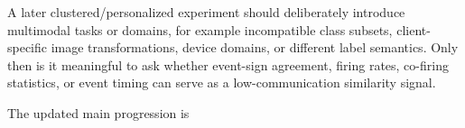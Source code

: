 A later clustered/personalized experiment should deliberately introduce multimodal tasks or domains, for example incompatible class subsets, client-specific image transformations, device domains, or different label semantics. Only then is it meaningful to ask whether event-sign agreement, firing rates, co-firing statistics, or event timing can serve as a low-communication similarity signal.

The updated main progression is
\begin{center}
\end{center}
